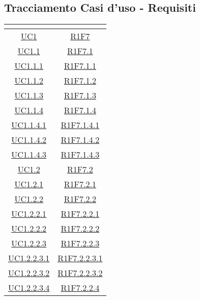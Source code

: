 \subsection{Tracciamento Casi d'uso - Requisiti}
\vspace{1cm}
\normalsize
\renewcommand{\arraystretch}{1.5}
\begin{longtable}{|c|c|}
	\hline
	\rowcolor{title_row}
	\textbf{\color{title_text}{Codice Casi d'uso}} & \textbf{\color{title_text}{Codice Requisiti}} \\
	\hline
	\endhead
	\hyperlink{UC1}{UC1} & \hyperlink{R1F7}{R1F7} \\
	\hline
	\hyperlink{UC1.1}{UC1.1} & \hyperlink{R1F7.1}{R1F7.1}\\
	\hline
	\hyperlink{UC1.1.1}{UC1.1.1} & \hyperlink{R1F7.1.1}{R1F7.1.1}\\
	\hline
	\hyperlink{UC1.1.2}{UC1.1.2} & \hyperlink{R1F7.1.2}{R1F7.1.2}\\
	\hline
	\hyperlink{UC1.1.3}{UC1.1.3} & \hyperlink{R1F7.1.3}{R1F7.1.3}\\
	\hline
	\hyperlink{UC1.1.4}{UC1.1.4} & \hyperlink{R1F7.1.4}{R1F7.1.4}\\
	\hline
	\hyperlink{UC1.1.4.1}{UC1.1.4.1} & \hyperlink{R1F7.1.4.1}{R1F7.1.4.1}\\
	\hline
	\hyperlink{UC1.1.4.2}{UC1.1.4.2} & \hyperlink{R1F7.1.4.2}{R1F7.1.4.2}\\
	\hline
	\hyperlink{UC1.1.4.3}{UC1.1.4.3} & \hyperlink{R1F7.1.4.3}{R1F7.1.4.3}\\
	\hline
	\hyperlink{UC1.2}{UC1.2} & \hyperlink{R1F7.2}{R1F7.2}\\
	\hline
	\hyperlink{UC1.2.1}{UC1.2.1} & \hyperlink{R1F7.2.1}{R1F7.2.1}\\
	\hline
	\hyperlink{UC1.2.2}{UC1.2.2} & \hyperlink{R1F7.2.2}{R1F7.2.2}\\
	\hline
	\hyperlink{UC1.2.2.1}{UC1.2.2.1} & \hyperlink{R1F7.2.2.1}{R1F7.2.2.1}\\
	\hline
	\hyperlink{UC1.2.2.2}{UC1.2.2.2} & \hyperlink{R1F7.2.2.2}{R1F7.2.2.2}\\
	\hline
	\hyperlink{UC1.2.2.3}{UC1.2.2.3} & \hyperlink{R1F7.2.2.3}{R1F7.2.2.3}\\
	\hline
	 \hyperlink{UC1.2.2.3.1}{UC1.2.2.3.1} &  \hyperlink{R1F7.2.2.3.1}{R1F7.2.2.3.1}\\
	\hline
	\hyperlink{UC1.2.2.3.2}{UC1.2.2.3.2} & \hyperlink{R1F7.2.2.3.2}{R1F7.2.2.3.2} \\
	\hline
	\hyperlink{UC1.2.2.4}{UC1.2.2.3.4} & \hyperlink{R1F7.2.2.4}{R1F7.2.2.4} \\

\end{longtable}
